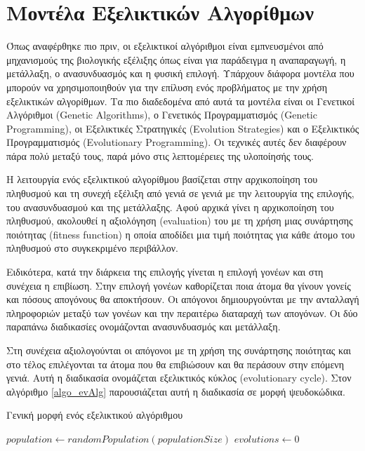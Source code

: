 \section{Μοντέλα Εξελικτικών Αλγορίθμων}

Όπως αναφέρθηκε πιο πριν, οι εξελικτικοί αλγόριθμοι είναι εμπνευσμένοι από μηχανισμούς της βιολογικής εξέλιξης όπως είναι για παράδειγμα η αναπαραγωγή, η μετάλλαξη, ο ανασυνδυασμός και η φυσική επιλογή. \cite{_evolutionary_2014} Υπάρχουν διάφορα μοντέλα που μπορούν να χρησιμοποιηθούν για την επίλυση ενός προβλήματος με την χρήση εξελικτικών αλγορίθμων. Τα πιο διαδεδομένα από αυτά τα μοντέλα είναι οι Γενετικοί Αλγόριθμοι (Genetic Algorithms), ο Γενετικός Προγραμματισμός (Genetic Programming), οι Εξελικτικές Στρατηγικές (Evolution Strategies) και ο Εξελικτικός Προγραμματισμός (Evolutionary Programming). Οι τεχνικές αυτές δεν διαφέρουν πάρα πολύ μεταξύ τους, παρά μόνο στις λεπτομέρειες της υλοποίησής τους. \cite{Adamidis}

Η λειτουργία ενός εξελικτικού αλγορίθμου βασίζεται στην αρχικοποίηση του πληθυσμού και τη συνεχή εξέλιξη από γενιά σε γενιά με την λειτουργία της επιλογής, του ανασυνδυασμού και της μετάλλαξης. Αφού αρχικά γίνει η αρχικοποίηση του πληθυσμού, ακολουθεί η αξιολόγηση (evaluation) του με τη χρήση μιας συνάρτησης ποιότητας (fitness function) η οποία αποδίδει μια τιμή ποιότητας για κάθε άτομο του πληθυσμού στο συγκεκριμένο περιβάλλον.

Ειδικότερα, κατά την διάρκεια της επιλογής γίνεται η επιλογή γονέων και στη συνέχεια η επιβίωση. Στην επιλογή γονέων καθορίζεται ποια άτομα θα γίνουν γονείς και πόσους απογόνους θα αποκτήσουν. Οι απόγονοι δημιουργούνται με την ανταλλαγή πληροφοριών μεταξύ των γονέων και την περαιτέρω διαταραχή των απογόνων. Οι δύο παραπάνω διαδικασίες ονομάζονται ανασυνδυασμός και μετάλλαξη.

Στη συνέχεια αξιολογούνται οι απόγονοι με τη χρήση της συνάρτησης ποιότητας και στο τέλος επιλέγονται τα άτομα που θα επιβιώσουν και θα περάσουν στην επόμενη γενιά. Αυτή η διαδικασία ονομάζεται εξελικτικός κύκλος (evolutionary cycle). Στον αλγόριθμο \ref{algo_evAlg} παρουσιάζεται αυτή η διαδικασία σε μορφή ψευδοκώδικα.

%    

\begin{algorithm}[!t]
    \caption{Γενική μορφή ενός εξελικτικού αλγόριθμου}
    \label{algo_evAlg}
    $population \gets randomPopulation(populationSize)$\;
    $evolutions \gets 0$\;
    \;
\end{algorithm}

